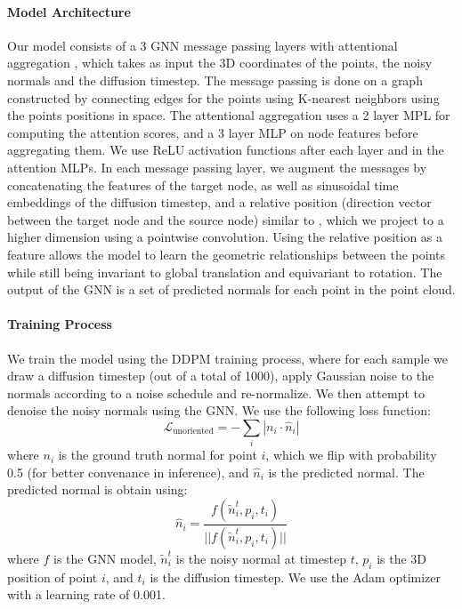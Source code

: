 \documentclass{acmart}
\begin{document}
\paragraph{Model Architecture}
Our model consists of a 3 GNN message passing layers with attentional aggregation \cite{li2019graph}, which takes as input the 3D coordinates of the points, the noisy normals and the diffusion timestep. The message passing is done on a graph constructed by connecting edges for the points using K-nearest neighbors using the points positions in space. The attentional aggregation uses a 2 layer MPL for computing the attention scores, and a 3 layer MLP on node features before aggregating them. We use ReLU activation functions after each layer and in the attention MLPs. In each message passing layer, we augment the messages by concatenating the features of the target node, as well as sinusoidal time embeddings of the diffusion timestep, and a relative position (direction vector between the target node and the source node) similar to \cite{qi2017pointnet++}, which we project to a higher dimension using a pointwise convolution. Using the relative position as a feature allows the model to learn the geometric relationships between the points while still being invariant to global translation and equivariant to rotation. The output of the GNN is a set of predicted normals for each point in the point cloud.


\paragraph{Training Process}
We train the model using the DDPM training process, where for each sample we draw a diffusion timestep (out of a total of 1000), apply Gaussian noise to the normals according to a noise schedule and re-normalize. We then attempt to denoise the noisy normals using the GNN. We use the following loss function:
\begin{equation}
  \mathcal{L}_{\text{unoriented}} = -\sum_i \left|n_i \cdot \hat{n}_i\right|  
\end{equation}
where $n_i$ is the ground truth normal for point $i$, which we flip with probability 0.5 (for better convenance in inference), and $\hat{n}_i$ is the predicted normal. The predicted normal is obtain using:
\begin{equation}
    \hat{n}_i = \frac{f(\tilde{n}_i^t, p_i, t_i)}{||f(\tilde{n}_i^t, p_i, t_i)||}
\end{equation}
where $f$ is the GNN model, $\tilde{n}_i^t$ is the noisy normal at timestep $t$, $p_i$ is the 3D position of point $i$, and $t_i$ is the diffusion timestep. We use the Adam optimizer with a learning rate of 0.001.
\end{document}
